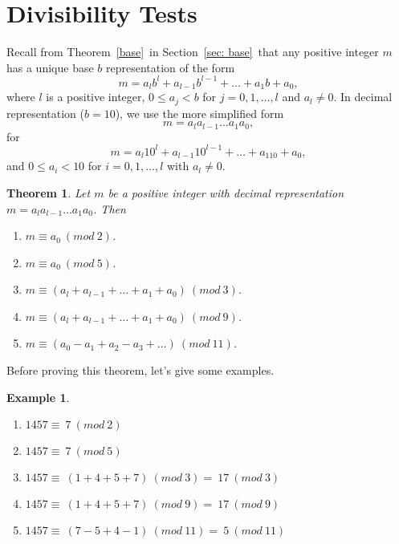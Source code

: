 \documentclass[12pt,letterpaper]{book}
\newtheorem{theorem}{Theorem}
\newtheorem{example}{Example}
\begin{document}
\section{Divisibility Tests}

Recall from Theorem~\ref{base}~in Section~\ref{sec: base}~that any positive integer $m$ has a unique base $b$ representation of the form
\begin{equation*} m=a_{l}b^l+a_{l-1}b^{l-1}+\ldots+a_1b+a_0,
\end{equation*}
where $l$ is a positive integer, $0\leq a_j<b$ for $j=0,1,\ldots,l$ and $a_l\neq 0$.  In decimal representation ($b=10$), we use the more simplified form 
\begin{equation*} m=a_{l}a_{l-1}\ldots a_1a_0,
\end{equation*} for
$$ m=a_{l}10^{l}+a_{l-1}10^{l-1}+\ldots+a_110+a_0,
$$ and $0\leq a_i< 10$ for $i=0,1,\ldots,l$ with $a_l\neq 0$.

\begin{theorem} \label{divs1} Let $m$ be a positive integer with decimal representation\\ $m=a_{l}a_{l-1}\ldots a_1a_0$.  Then
\begin{enumerate}
\item  $m\equiv a_0~(mod~2)$.

\item  $m\equiv a_0~(mod~5)$.

\item  $m\equiv \left(a_{l}+a_{l-1}+\ldots+a_1+a_0\right)~(mod~3)$.

\item  $m\equiv \left(a_{l}+a_{l-1}+\ldots+a_1+a_0\right)~(mod~9)$.

\item  $m\equiv \left(a_0-a_1+a_2-a_3+\ldots\right)~(mod~11)$.
\end{enumerate}
\end{theorem}

Before proving this theorem, let's give some examples. 
\begin{example}~
	\begin{enumerate}
		\item $1457\equiv~7~(mod~2)$%
		\item $1457\equiv~7~(mod~5)$%
		\item $1457\equiv~(1+4+5+7)~(mod~3)=~17~(mod~3)$%
		\item $1457\equiv~(1+4+5+7)~(mod~9)=~17~(mod~9)$%
		\item $1457\equiv~(7-5+4-1)~(mod~11)=~5~(mod~11)$
	\end{enumerate}
\end{example}
\end{document}
